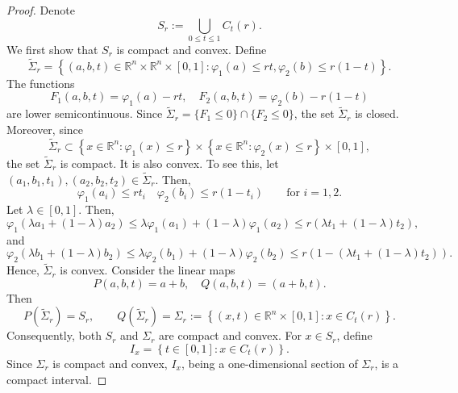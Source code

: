 \documentclass[11pt]{amsart}
\theoremstyle{plain}
\theoremstyle{definition}
\theoremstyle{remark}
\begin{document}
\begin{proof}
    Denote
    \[
        S_r:=\bigcup_{0 \leq t \leq 1} C_t(r).
    \]
    We first show that $S_r$ is compact and convex.
    Define
$$
\widetilde{\Sigma}_r=\left\{(a, b, t) \in \mathbb{R}^n \times \mathbb{R}^n \times[0,1]: \varphi_1(a) \leq r t, \varphi_2(b) \leq r(1-t)\right\} .
$$
The functions
$$
F_1(a, b, t) = \varphi_1(a)-r t, \quad F_2(a, b, t) = \varphi_2(b)-r(1-t)
$$
are lower semicontinuous. Since $ \widetilde{\Sigma}_r = \{F_1\leq 0\} \cap \{ F_2 \leq 0\}$,  the set $\widetilde{\Sigma}_r$ is closed. Moreover, since
$$
\widetilde{\Sigma}_r \subset \left\{x \in \mathbb{R}^n: \varphi_1(x) \leq r\right\} \times \left\{x \in \mathbb{R}^n: \varphi_2(x) \leq r\right\} \times[0,1],
$$
the set $\widetilde{\Sigma}_r$ is compact. It is also convex.  To see this,
    let $(a_1,b_1,t_1),(a_2,b_2,t_2) \in \widetilde{\Sigma}_r$. Then,
    \[
    \varphi_1(a_i) \leq rt_i \quad \varphi_2(b_i) \leq r(1-t_i) \qquad \text{for } i =1,2.
    \]
    Let $\lambda \in [0,1]$. Then,
    \[
        \varphi_1 (\lambda a_1 +(1-\lambda)a_2) \leq \lambda \varphi_1\left(a_1\right)+(1-\lambda) \varphi_1\left(a_2\right) \leq r (\lambda t_1+(1-\lambda) t_2),
    \]
    and
    \[
        \varphi_2 (\lambda b_1+(1-\lambda) b_2) \leq \lambda \varphi_2\left(b_1\right)+(1-\lambda) \varphi_2\left(b_2\right) \leq r(1-(\lambda t_1+(1-\lambda) t_2)).
    \]
    Hence, $\widetilde{\Sigma}_r$ is convex.
    Consider the linear maps
    $$
    P(a, b, t)=a+b, \quad Q(a, b, t)=(a+b, t) .
    $$
    Then
    $$
    P\left(\widetilde{\Sigma}_r\right)=S_r
    , \qquad
    Q\left(\widetilde{\Sigma}_r\right)=\Sigma_r:=\left\{(x, t) \in \mathbb{R}^n \times[0,1]: x \in C_t(r)\right\} .
    $$
    Consequently, both $S_r$ and $\Sigma_r$ are compact and convex.
    For $x \in S_r$, define
    $$
    I_x=\left\{t \in[0,1]: x \in C_t(r)\right\} .
    $$
    Since $\Sigma_r$ is compact and convex, $I_x$, being a one-dimensional section of $\Sigma_r$, is a compact interval.


\end{proof}
\end{document}

